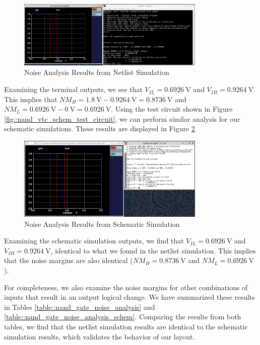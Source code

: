 \documentclass{article}
\begin{document}
	\begin{figure}[H]
		\centerline{\includegraphics[width=0.8\textwidth]{nand_noise_analysis.png}}
		\caption{Noise Analysis Results from Netlist Simulation}
		\label{fig::nand_noise_analysis}
	\end{figure}
	
	\noindent Examining the terminal outputs, we see that $V_{IL} = 0.6926\ \text{V}$ and $V_{IH} = 0.9264\ \text{V}$. This implies that $NM_H = 1.8\ \text{V} - 0.9264\ \text{V} = 0.8736\ \text{V}$ and $NM_L = 0.6926\ \text{V} - 0\ \text{V} = 0.6926\ \text{V}$. Using the test circuit shown in Figure \ref{fig::nand_vtc_schem_test_circuit}, we can perform similar analysis for our schematic simulations. These results are displayed in Figure \ref{fig::nand_noise_analysis_schem}.
	
	\begin{figure}[H]
		\centerline{\includegraphics[width=0.8\textwidth]{nand_noise_analysis_schem.png}}
		\caption{Noise Analysis Results from Schematic Simulation}
		\label{fig::nand_noise_analysis_schem}
	\end{figure}
	
	\noindent Examining the schematic simulation outputs, we find that $V_{IL} = 0.6926\ \text{V}$ and $V_{IH} = 0.9264\ \text{V}$, identical to what we found in the netlist simulation. This implies that the noise margins are also identical ($NM_H = 0.8736\ \text{V}$ and $NM_L = 0.6926\ \text{V}$).	
	
	For completeness, we also examine the noise margins for other combinations of inputs that result in an output logical change. We have summarized these results in Tables \ref{table::nand_gate_noise_analysis} and \ref{table::nand_gate_noise_analysis_schem}. Comparing the results from both tables, we find that the netlist simulation results are identical to the schematic simulation results, which validates the behavior of our layout.
	
\end{document}
